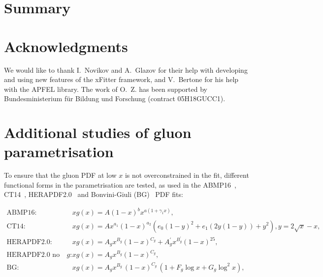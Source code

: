 \documentclass[12pt]{article}
\begin{document}
\section{Summary}
\label{sec:summary}

\section*{Acknowledgments}

We would like to thank I.~Novikov and A.~Glazov for their help with developing and using new features of the xFitter framework, and V.~Bertone for his help with the APFEL library.
The work of O.~Z. has been supported by Bundesministerium f\"ur Bildung und Forschung (contract 05H18GUCC1).





\clearpage
\appendix

\section{Additional studies of gluon parametrisation}
\label{sec:gluonpar}

To ensure that the gluon PDF at low $x$ is not overconstrained in the fit, different functional forms in the parametrisation 
are tested, as used in the ABMP16~\cite{Alekhin:2017kpj}, CT14~\cite{Dulat:2015mca}, HERAPDF2.0~\cite{Abramowicz:2015mha} and Bonvini-Giuli (BG)~\cite{Bonvini:2019wxf} PDF fits:

\begin{equation}
\begin{aligned}
\textrm{ABMP16:}~~~~~~ &xg(x)=A (1 - x)^b x^{a (1 + \gamma_{1} x)},\\
\textrm{CT14:}~~~~~~ &xg(x) = Ax^{a_1}(1-x)^{a_2}(e_0(1-y)^2+e_1(2y(1-y))+y^2), y=2\sqrt{x}-x,\\
\textrm{HERAPDF2.0:}~~~~~~ &xg(x)=A_gx^{B_g}(1-x)^{C_g}+A^{\prime}_gx^{B^{\prime}_g}(1-x)^{25},\\
\textrm{HERAPDF2.0 no flex. $g$:}~~~~~~ &xg(x)=A_gx^{B_g}(1-x)^{C_g},\\
\textrm{BG:}~~~~~~ &xg(x)=A_{g} x^{B_{g}}\,(1-x)^{C_{g}}\, (1 + F_{g} {\log x} + G_{g} {\log^2 x}),\\
\end{aligned}
\label{eq:gluonpar}
\end{equation}
\end{document}

